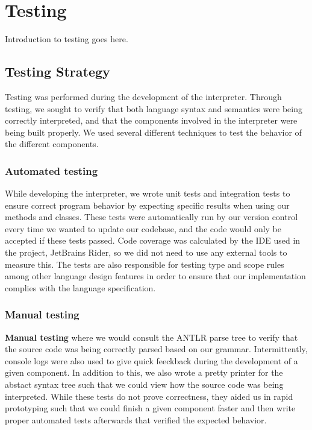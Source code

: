 \chapter{Testing}

Introduction to testing goes here.

\section{Testing Strategy}
Testing was performed during the development of the \dazel{} interpreter. 
Through testing, we sought to verify that both language syntax and semantics were being correctly interpreted, and that the components involved in the interpreter were being built properly.
We used several different techniques to test the behavior of the different components. 

\subsection*{Automated testing}
While developing the interpreter, we wrote unit tests and integration tests to ensure correct program behavior by expecting specific results when using our methods and classes. 
These tests were automatically run by our version control every time we wanted to update our codebase, and the code would only be accepted if these tests passed.
Code coverage was calculated by the IDE used in the project, JetBrains Rider, so we did not need to use any external tools to measure this\cite{rider_test_coverage}.
The tests are also responsible for testing type and scope rules among other language design features in order to ensure that our implementation complies with the language specification.

\subsection*{Manual testing}
\textbf{Manual testing} where we would consult the ANTLR parse tree to verify that the source code was being correctly parsed based on our grammar. 
Intermittently, console logs were also used to give quick feeckback during the development of a given component.
In addition to this, we also wrote a pretty printer for the abstact syntax tree such that we could view how the source code was being interpreted.
While these tests do not prove correctness, they aided us in rapid prototyping such that we could finish a given component faster and then write proper automated tests afterwards that verified the expected behavior.  

